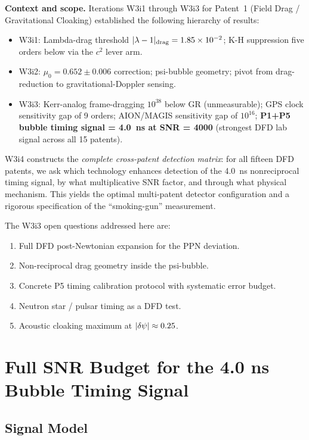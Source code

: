 \noindent\textbf{Context and scope.}
Iterations W3i1 through W3i3 for Patent~1 (Field Drag / Gravitational
Cloaking) established the following hierarchy of results:
\begin{itemize}[nosep]
\item W3i1: Lambda-drag threshold $|\lambda - 1|_{\rm drag} = 1.85\times 10^{-2}$;
  K-H suppression five orders below via the $c^2$ lever arm.
\item W3i2: $\mu_0 = 0.652 \pm 0.006$ correction; psi-bubble geometry;
  pivot from drag-reduction to gravitational-Doppler sensing.
\item W3i3: Kerr-analog frame-dragging $10^{38}$ below GR (unmeasurable);
  GPS clock sensitivity gap of 9 orders; AION/MAGIS sensitivity gap of
  $10^{16}$; \textbf{P1+P5 bubble timing signal = 4.0~ns at SNR = 4000}
  (strongest DFD lab signal across all 15 patents).
\end{itemize}

W3i4 constructs the \emph{complete cross-patent detection matrix}: for all
fifteen DFD patents, we ask which technology enhances detection of the
4.0~ns nonreciprocal timing signal, by what multiplicative SNR factor, and
through what physical mechanism. This yields the optimal multi-patent
detector configuration and a rigorous specification of the ``smoking-gun''
measurement.

The W3i3 open questions addressed here are:
\begin{enumerate}[nosep,label=\textbf{Q\arabic*.}]
\item Full DFD post-Newtonian expansion for the PPN deviation.
\item Non-reciprocal drag geometry inside the psi-bubble.
\item Concrete P5 timing calibration protocol with systematic error budget.
\item Neutron star / pulsar timing as a DFD test.
\item Acoustic cloaking maximum at $|\delta\psi| \approx 0.25$.
\end{enumerate}

\section{Full SNR Budget for the 4.0 ns Bubble Timing Signal}
\label{sec:snr_budget}

\subsection{Signal Model}
\label{ssec:signal}

